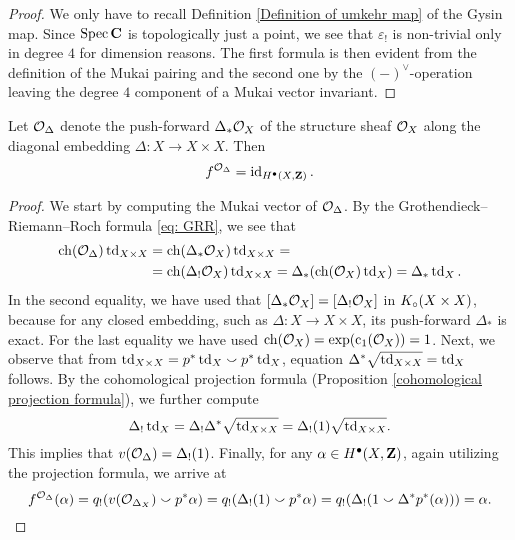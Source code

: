 \begin{proof}
    We only have to recall Definition \ref{Definition of umkehr map} of the Gysin map. Since $\operatorname{Spec}\mathbf C$ is topologically just a point, we see that $\varepsilon_!$ is non-trivial only in degree $4$ for dimension reasons. The first formula is then evident from the definition of the Mukai pairing and the second one by the $(-)^\vee$-operation leaving the degree $4$ component of a Mukai vector invariant.
\end{proof}

\begin{lemma}
    \label{cohomological fm of diagonal}
    \emph{\cite[\S 5, Proposition 5.33]{huybrechts2006fouriermukai}}
    Let ${\mathcal{O}_{\Delta}}$ denote the push-forward $\Delta_*{\mathcal{O}_{X}}$ of the structure sheaf ${\mathcal{O}_{X}}$ along the diagonal embedding $\Delta \colon X \to X \times X$. Then
    \[
        f^{{\mathcal{O}_{\Delta}}} = \operatorname{id}_{H^{\bullet}(X, \mathbf Z)}.
    \]
\end{lemma}

\begin{proof}
    We start by computing the Mukai vector of ${\mathcal{O}_{\Delta}}$. By the Grothendieck--Rie\-mann--Roch formula \eqref{eq: GRR}, we see that
    \begin{align*}
        \ch(\struct{\Delta}) \tdclass{X \times X} &= \ch(\Delta_*\struct{X})\tdclass{X \times X} = \\ &= \ch(\Delta_!\struct{X})\tdclass{X \times X} = \Delta_*(\ch(\struct{X}) \tdclass{X}) = \Delta_*\tdclass{X}.
    \end{align*}
    In the second equality, we have used that $[\Delta_*{\mathcal{O}_{X}}] = [\Delta_!{\mathcal{O}_{X}}]$ in $K_{\circ}(X \times X)$, because for any closed embedding, such as $\Delta \colon X \to X \times X$, its push-forward $\Delta_*$ is exact. For the last equality we have used $\ch(\struct{X}) = \exp(\cclass[1](\struct{X})) = 1$. Next, we observe that from $\operatorname{td}_{X \times X} = p^*\operatorname{td}_{X} \smallsmile p^*\operatorname{td}_{X}$, equation $\Delta^*\sqrt{\operatorname{td}_{X\times X}} = \operatorname{td}_{X}$ follows. By the cohomological projection formula (\cf Proposition \ref{cohomological projection formula}), we further compute
    \[
        \Delta_!\operatorname{td}_{X} = \Delta_!\Delta^*\sqrt{\operatorname{td}_{X \times X}} = \Delta_!(1)\sqrt{\operatorname{td}_{X \times X}}.
    \] 
    This implies that $v({\mathcal{O}_{\Delta}}) = \Delta_!(1)$. 
    Finally, for any $\alpha \in H^{\bullet}(X, \mathbf Z)$, again utilizing  the projection formula, we arrive at
    \[
        f^{{\mathcal{O}_{\Delta}}}(\alpha) = q_!(v({\mathcal{O}_{\Delta_X}})\smallsmile p^*\alpha) = q_!(\Delta_!(1)\smallsmile p^*\alpha) = q_!(\Delta_!(1\smallsmile \Delta^*p^*(\alpha))) = \alpha. \qedhere
    \]
\end{proof}

